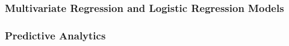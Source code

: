 \documentclass[
]{article}
\begin{document}
\hypertarget{multivariate-regression-and-logistic-regression-models}{%
\subsubsection{Multivariate Regression and Logistic Regression
Models}\label{multivariate-regression-and-logistic-regression-models}}

\hypertarget{predictive-analytics}{%
\subsubsection{Predictive Analytics}\label{predictive-analytics}}
\end{document}
